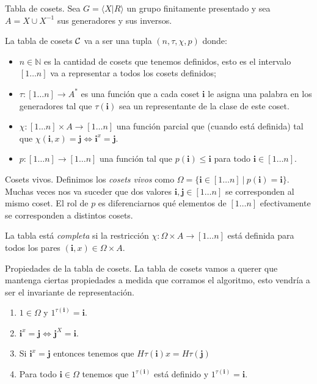 \documentclass[aspectratio=169, 9pt]{beamer}
\newcommand{\fp}{finitamente presentado }
\newcommand{\In}{[1 \dots n]}
\newcommand{\Co}{{\cal{C}}}
\begin{document}
\begin{frame}[fragile]{Tabla de cosets.}
	Sea $G = \langle X | R \rangle$ un grupo \fp y sea $A = X \cup X^{-1}$ sus generadores y sus inversos.
	\pause
	
	La tabla de cosets $\Co $ va a ser una tupla $(n, \tau, \chi, p)$ donde:
	\pause
	\begin{itemize}
		\item $n \in  \mathbb{N}$ es la cantidad de cosets que tenemos definidos, esto es el intervalo $\In$ va a representar a todos los cosets definidos;
		\pause
		\item $\tau : \In \to A^*$ es una función que a cada coset $\textbf{i}$ le asigna una palabra en los generadores tal que $\tau(\textbf{i})$ sea un representante de la clase de este coset.
		\pause
		\item $\chi: \In \times A \to \In$ una función parcial que (cuando está definida) tal que $\chi(\textbf{i}, x) = \textbf{j} \iff \textbf{i}^x = \textbf{j}$.
		\pause
		\item $p: [1 \dots n] \to [1 \dots n]$ una función tal que $p(\textbf{i}) \le \textbf{i}$ para todo $\textbf{i} \in [1\dots n]$.
	\end{itemize}
	
\end{frame}

\begin{frame}[fragile]{Cosets vivos.}
	Definimos los \emph{cosets vivos} como $\Omega = \{ \textbf{i} \in \In  \ | \ p(\textbf{i}) = \textbf{i} \}$.
	Muchas veces nos va suceder que dos valores $\textbf{i}, \textbf{j} \in \In$ se corresponden al mismo coset.
	El rol de $p$ es diferenciarnos qué elementos de $\In$ efectivamente se corresponden a distintos cosets.
	\pause
	\medskip
	
	
	
	La tabla está \emph{completa} si la restricción $\chi:\Omega \times A \to \In$ está definida para todos los pares $(\textbf{i}, x) \in \Omega \times A$. 
\end{frame}

\begin{frame}[fragile]{Propiedades de la tabla de cosets.}
	La tabla de cosets vamos a querer que mantenga ciertas propiedades a medida que corramos el algoritmo, esto vendría a ser el invariante de representación.
	\pause
	
	
	
	\begin{enumerate}
		\item $1 \in \Omega$ y $1^{\tau(\textbf{i})} = \textbf{i}$.
		\pause
		\item $\textbf{i}^x = \textbf{j} \iff \textbf{j}^{X} = \textbf{i}$.
		\pause
		\item Si $\textbf{i}^x = \textbf{j}$ entonces tenemos que $H \tau(\textbf{i}) x = H \tau(\textbf{j})$
		\pause
		\item Para todo $\textbf{i} \in \Omega$ tenemos que $1^{\tau(\textbf{i})}$ está definido y $1^{\tau(\textbf{i})} = \textbf{i}$.
	\end{enumerate}
\end{frame}
\end{document}
